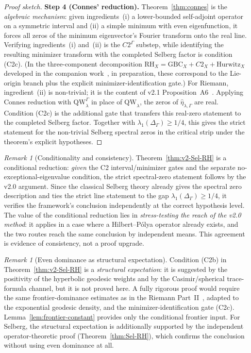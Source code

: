 \documentclass[12pt,a4paper]{article}
\theoremstyle{definition}
\theoremstyle{remark}
\newtheorem{remark}[theorem]{Remark}
\newcommand{\QW}{\mathrm{QW}}
\newcommand{\Delop}{\Delta_{\Gamma}}
\begin{document}
\begin{proof}[Proof sketch]
\smallskip\noindent
\textbf{Step 4 (Connes' reduction).} Theorem~\ref{thm:connes} is the
\emph{algebraic mechanism}: given ingredients~(i) a lower-bounded self-adjoint
operator on a symmetric interval and (ii) a simple minimum with even eigenfunction,
it forces all zeros of the minimum eigenvector's Fourier transform onto the real
line.  Verifying ingredients~(i) and~(ii) is the $C2^\Gamma$ substep, while
identifying the resulting minimizer transform with the completed Selberg
factor is condition (C2c).  (In the three-component
decomposition $\mathrm{RH}_X = \mathrm{GBC}_X + C2_X + \mathrm{Hurwitz}_X$
developed in the companion work~\cite{GeigerMeta2026}, in preparation, these
correspond to the Lie-origin branch plus the explicit minimizer-identification
gate.) For Riemann,
ingredient~(ii) is non-trivial; it is the content of v2.1
Proposition~A6~\cite{Geiger2026partII}. Applying Connes reduction with
$\QW^\Gamma_\lambda$ in place of $\QW_\lambda$, the zeros of
$\widehat{\eta}_{\lambda,\Gamma}$ are real.  Condition (C2c) is the additional
gate that transfers this real-zero statement to the completed Selberg factor.
Together with $\lambda_1(\Delop)\ge 1/4$, this gives the strict statement for
the non-trivial Selberg spectral zeros in the critical strip under the
theorem's explicit hypotheses.
\end{proof}

\begin{remark}[Conditionality and consistency]
Theorem~\ref{thm:v2-Sel-RH} is a conditional reduction: \emph{given} the C2
interval/minimizer gates and the separate no-exceptional-eigenvalue condition, the
strict spectral-zero statement follows by the v2.0 argument.  Since the classical
Selberg theory already gives the spectral zero description and ties the
strict line statement to the gap $\lambda_1(\Delop)\ge 1/4$, it verifies the
framework's conclusion independently at the correct hypothesis level.  The
value of the conditional reduction lies in \emph{stress-testing the reach of
the v2.0 method}: it applies in a case where a Hilbert--Pólya operator
already exists, and the two routes reach the same conclusion by independent
means.  This agreement is evidence of consistency, not a proof upgrade.
\end{remark}

\begin{remark}[Even dominance as structural expectation]
\label{rem:even-dominance-structural}
Condition (C2b) in Theorem~\ref{thm:v2-Sel-RH} is a
\emph{structural expectation}: it is suggested by the positivity of the
hyperbolic geodesic weights and by the Casimir/spherical trace-formula channel,
but it is not proved here.  A fully rigorous proof would require the same
frontier-dominance estimates as in the Riemann Part~II~\cite{Geiger2026partII}, adapted to the exponential geodesic density, and the
minimizer-identification gate (C2c). Lemma~\ref{lem:frontier-constant}
provides only the conditional frontier input. For Selberg, the structural
expectation is additionally supported by the
independent operator-theoretic proof (Theorem~\ref{thm:Sel-RH}), which
confirms the conclusion without using even dominance at all.
\end{remark}
\end{document}
